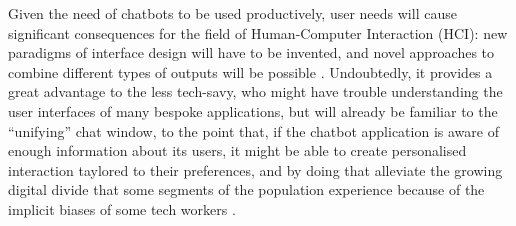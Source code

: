 Given the need of chatbots to be used productively, user needs will cause significant consequences for the field of Human-Computer Interaction (HCI): new paradigms of interface design will have to be invented, and novel approaches to combine different types of outputs will be possible \cite{Følstad2017}. Undoubtedly, it provides a great advantage to the less tech-savy, who might have trouble understanding the user interfaces of many bespoke applications, but will already be familiar to the ``unifying'' chat window, to the point that, if the chatbot application is aware of enough information about its users, it might be able to create personalised interaction taylored to their preferences, and by doing that alleviate the growing digital divide that some segments of the population experience because of the implicit biases of some tech workers \cite{Brandtzæg2010}.

